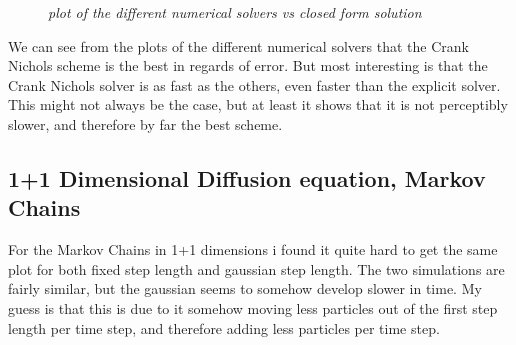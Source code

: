 \documentclass[english,a4paper,12pt]{article}
\begin{document}
\begin{figure}[H]
\begin{center}
 \end{center}
 \caption{\textit{plot of the different numerical solvers vs closed form solution}}
 \label{fig:edge}
\end{figure}

We can see from the plots of the different numerical solvers that the Crank Nichols scheme is the best in regards of error. But most 
interesting is that the Crank Nichols solver is as fast as the others, even faster than the explicit solver. This might not always
be the case, but at least it shows that it is not perceptibly slower, and therefore by far the best scheme.


\subsection*{1+1 Dimensional Diffusion equation, Markov Chains}

For the Markov Chains in 1+1 dimensions i found it quite hard to get the same plot for both fixed step length and gaussian step length.
The two simulations are fairly similar, but the gaussian seems to somehow develop slower in time. My guess is that this is due to
it somehow moving less particles out of the first step length per time step, and therefore adding less particles per time step.
\end{document}
